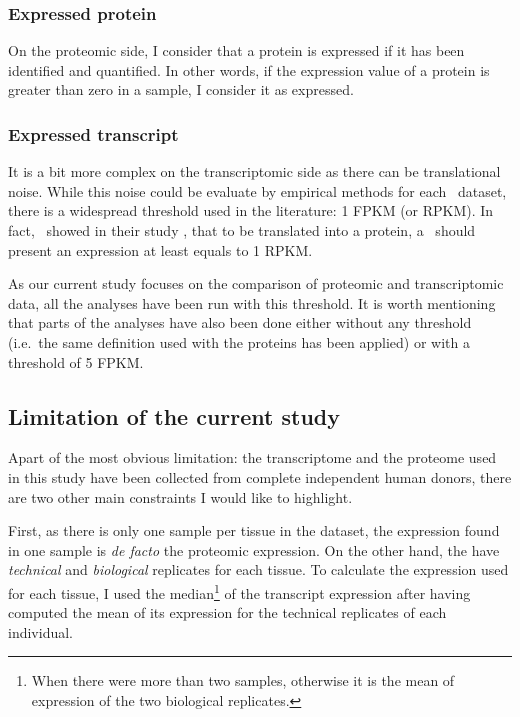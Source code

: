\subsubsection{Expressed protein}
On the proteomic side, I consider that a protein is expressed if it has been
identified and quantified. In other words, if the expression value of a protein
is greater than zero in a sample, I consider it as expressed.

\subsubsection{Expressed transcript}
It is a bit more complex on the transcriptomic side as there can be
translational noise. While this noise could be evaluate by empirical methods for
each \Rnaseq\ dataset, there is a widespread threshold used in the literature:
1 \gls{FPKM} (or \gls{RPKM}). In fact,~\cite{Hebenstreit:2011} showed in
their study , that to be translated into a protein, a \mRNA\ should
present an expression at least equals to 1 \gls{RPKM}.

As our current study focuses on the comparison of proteomic and transcriptomic
data, all the analyses have been run with this threshold. It is worth mentioning
that parts of the analyses have also been done either without
any threshold (i.e.\ the same definition used with the proteins has been applied)
or with a threshold of 5 \gls{FPKM}.

\subsection{Limitation of the current study}

Apart of the most obvious limitation: the transcriptome and the proteome used in
this study have been collected from complete independent human donors, there are
two other main constraints I would like to highlight.

First, as there is only one sample per tissue in the 
dataset, the expression found in one sample is \textit{de facto} the proteomic
expression. On the other hand, the  have \emph{technical}
and \emph{biological} replicates for each tissue. To calculate the expression
used for each tissue, I used the median\footnote{When there were more than
two samples, otherwise it is the mean of expression of the two biological
replicates.} of the transcript expression after having computed the mean of its
expression for the technical replicates of each individual.

